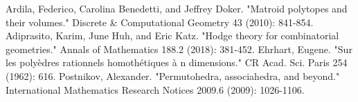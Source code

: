 \documentclass[12pt]{article}
\theoremstyle{definition}
\numberwithin{equation}{subsection}
\begin{document}
\begin{thebibliography}{99}
     Ardila, Federico, Carolina Benedetti, and Jeffrey Doker. "Matroid polytopes and their volumes." Discrete \& Computational Geometry 43 (2010): 841-854.
     Adiprasito, Karim, June Huh, and Eric Katz. "Hodge theory for combinatorial geometries." Annals of Mathematics 188.2 (2018): 381-452.
     Ehrhart, Eugene. "Sur les polyèdres rationnels homothétiques à n dimensions." CR Acad. Sci. Paris 254 (1962): 616.
     Postnikov, Alexander. "Permutohedra, associahedra, and beyond." International Mathematics Research Notices 2009.6 (2009): 1026-1106.
\end{thebibliography}
\end{document}
